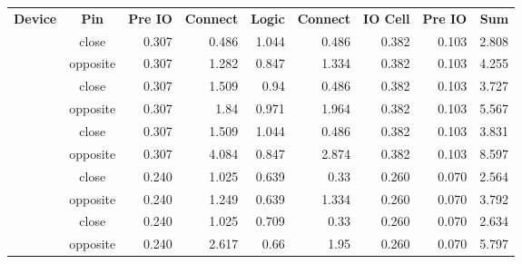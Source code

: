  
 
\renewcommand{\arraystretch}{1.5}
 \newcommand{\ct}{\color{white}\bf}
\begin{tabular}{cc*{7}{r}}
\rowcolor{Blue!50}
\ct Device & \ct Pin & \ct Pre IO & \ct Connect & \ct Logic & \ct Connect & \ct IO Cell & \ct Pre IO & \ct Sum \\
\rowcolor{white}
\hline  & close & 0.307 & 0.486 & 1.044 & 0.486 & 0.382 & 0.103 & 2.808\\
\rowcolor{white}
 \multirow{-2}{*}{lp384} & opposite & 0.307 & 1.282 & 0.847 & 1.334 & 0.382 & 0.103 & 4.255\\
\rowcolor{blue!10}
\hline  & close & 0.307 & 1.509 & 0.94 & 0.486 & 0.382 & 0.103 & 3.727\\
\rowcolor{blue!10}
 \multirow{-2}{*}{lp1k} & opposite & 0.307 & 1.84 & 0.971 & 1.964 & 0.382 & 0.103 & 5.567\\
\rowcolor{white}
\hline  & close & 0.307 & 1.509 & 1.044 & 0.486 & 0.382 & 0.103 & 3.831\\
\rowcolor{white}
 \multirow{-2}{*}{lp8k} & opposite & 0.307 & 4.084 & 0.847 & 2.874 & 0.382 & 0.103 & 8.597\\
\rowcolor{blue!10}
\hline  & close & 0.240 & 1.025 & 0.639 & 0.33 & 0.260 & 0.070 & 2.564\\
\rowcolor{blue!10}
 \multirow{-2}{*}{hx1k} & opposite & 0.240 & 1.249 & 0.639 & 1.334 & 0.260 & 0.070 & 3.792\\
\rowcolor{white}
\hline  & close & 0.240 & 1.025 & 0.709 & 0.33 & 0.260 & 0.070 & 2.634\\
\rowcolor{white}
 \multirow{-2}{*}{hx8k} & opposite & 0.240 & 2.617 & 0.66 & 1.95 & 0.260 & 0.070 & 5.797\\
\end{tabular}
